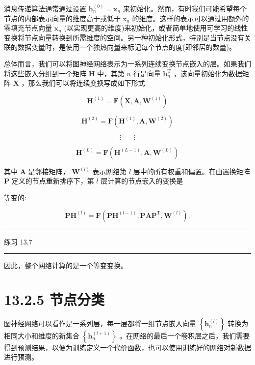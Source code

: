 \documentclass[10pt]{article}
\newcommand{\HRule}{\begin{center}\rule{0.9\linewidth}{0.2mm}\end{center}}
\begin{document}
消息传递算法通常通过设置 \({\mathbf{h}}_{n}^{\left( 0\right) } = {\mathbf{x}}_{n}\) 来初始化。然而，有时我们可能希望每个节点的内部表示向量的维度高于或低于 \({\mathrm{x}}_{n}\) 的维度。这样的表示可以通过用额外的零填充节点向量 \({\mathbf{x}}_{n}\) (以实现更高的维度)来初始化，或者简单地使用可学习的线性变换将节点向量转换到所需维度的空间。另一种初始化形式，特别是当节点没有关联的数据变量时，是使用一个独热向量来标记每个节点的度(即邻居的数量)。

总体而言，我们可以将图神经网络表示为一系列连续变换节点嵌入的层。如果我们将这些嵌入分组到一个矩阵 \(\mathbf{H}\) 中，其第 \(n\) 行是向量 \({\mathbf{h}}_{n}^{\mathrm{T}}\) ，该向量初始化为数据矩阵 \(\mathbf{X}\) ，那么我们可以将连续变换写成如下形式

\[
{\mathbf{H}}^{\left( 1\right) } = \mathbf{F}\left( {\mathbf{X},\mathbf{A},{\mathbf{W}}^{\left( 1\right) }}\right)
\]

\[
{\mathbf{H}}^{\left( 2\right) } = \mathbf{F}\left( {{\mathbf{H}}^{\left( 1\right) },\mathbf{A},{\mathbf{W}}^{\left( 2\right) }}\right)
\]

\[
\vdots \; = \;\vdots
\]

\[
{\mathbf{H}}^{\left( L\right) } = \mathbf{F}\left( {{\mathbf{H}}^{\left( L - 1\right) },\mathbf{A},{\mathbf{W}}^{\left( L\right) }}\right)  \tag{13.18}
\]

其中 \(\mathbf{A}\) 是邻接矩阵， \({\mathbf{W}}^{\left( l\right) }\) 表示网络第 \(l\) 层中的所有权重和偏置。在由置换矩阵 \(\mathbf{P}\) 定义的节点重新排序下，第 \(l\) 层计算的节点嵌入的变换是

等变的:

\[
{\mathbf{{PH}}}^{\left( l\right) } = \mathbf{F}\left( {{\mathbf{{PH}}}^{\left( l - 1\right) },{\mathbf{{PAP}}}^{\mathrm{T}},{\mathbf{W}}^{\left( l\right) }}\right) . \tag{13.19}
\]

\HRule

练习 13.7

\HRule

因此，整个网络计算的是一个等变变换。

\section*{13.2.5 节点分类}

图神经网络可以看作是一系列层，每一层都将一组节点嵌入向量 \(\left\{  {\mathbf{h}}_{n}^{\left( l\right) }\right\}\) 转换为相同大小和维度的新集合 \(\left\{  {\mathbf{h}}_{n}^{\left( l + 1\right) }\right\}\) 。在网络的最后一个卷积层之后，我们需要得到预测结果，以便为训练定义一个代价函数，也可以使用训练好的网络对新数据进行预测。
\end{document}
